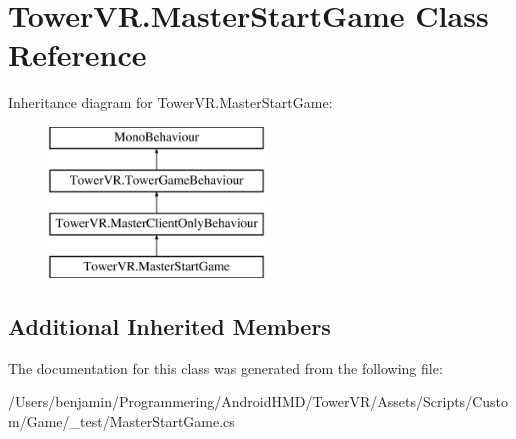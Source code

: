 \hypertarget{class_tower_v_r_1_1_master_start_game}{}\section{Tower\+V\+R.\+Master\+Start\+Game Class Reference}
\label{class_tower_v_r_1_1_master_start_game}
Inheritance diagram for Tower\+V\+R.\+Master\+Start\+Game\+:\begin{figure}[H]
\begin{center}
\leavevmode
\includegraphics[height=4.000000cm]{class_tower_v_r_1_1_master_start_game}
\end{center}
\end{figure}
\subsection*{Additional Inherited Members}


The documentation for this class was generated from the following file\+:\begin{DoxyCompactItemize}
\item 
/\+Users/benjamin/\+Programmering/\+Android\+H\+M\+D/\+Tower\+V\+R/\+Assets/\+Scripts/\+Custom/\+Game/\+\_\+test/Master\+Start\+Game.\+cs\end{DoxyCompactItemize}
